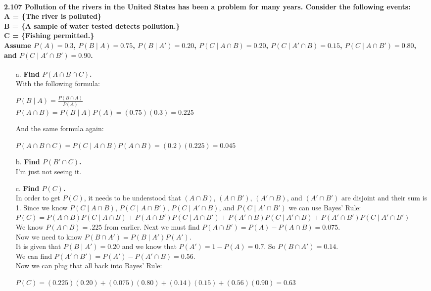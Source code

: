 \documentclass{article}
\begin{document}
\paragraph{2.107 Pollution of the rivers in the United States has been a problem for many 
years. Consider the following events:\\
A = \{The river is polluted\}\\
B = \{A sample of water tested detects pollution.\}\\
C = \{Fishing permitted.\}\\
Assume $P(A) = 0.3$, $P(B \mid A) = 0.75$, $P(B \mid A') = 0.20$, $P(C \mid A \cap B) = 0.20$,
$P(C \mid A' \cap B) = 0.15$, $P(C \mid A \cap B') = 0.80$, and $P(C \mid A' \cap B') = 0.90$.}
\begin{enumerate}
\item[a.] \textbf{Find $P(A \cap B \cap C)$.}\\
With the following formula:
\begin{center}
$P(B \mid A) = \frac{P(B \cap A)}{P(A)}$\\
$P(A \cap B) = P(B \mid A)P(A) = (0.75)(0.3) = 0.225$ 
\end{center}
And the same formula again:
\begin{center}
$\boxed{P(A \cap B \cap C) = P(C \mid A \cap B)P(A \cap B) = (0.2)(0.225) = 0.045}$
\end{center}
\item[b.] \textbf{Find $P(B' \cap C)$.}\\
I'm just not seeing it.
\item[c.] \textbf{Find $P(C)$.}\\
In order to get $P(C)$, it needs to be understood that $(A \cap B)$, $(A \cap B')$, $(A' \cap B)$,
and $(A' \cap B')$ are disjoint and their sum is 1. Since we know $P(C \mid A \cap B)$, 
$P(C \mid A \cap B')$, $P(C \mid A' \cap B)$, and $P(C \mid A' \cap B')$ we can use Bayes'
Rule:\\
$P(C) = P(A \cap B)P(C \mid A \cap B) + P(A \cap B')P(C \mid A \cap B') +
P(A' \cap B)P(C \mid A' \cap B) + P(A' \cap B')P(C \mid A' \cap B')$\\
We know $P(A \cap B) = .225$ from earlier. Next we must find $P(A \cap B') = 
P(A) - P(A \cap B) = 0.075$.\\
Now we need to know $P(B \cap A') = P(B \mid A')P(A')$.\\
It is given that $P(B \mid A') = 0.20$ and we know that $P(A') = 1-P(A) = 0.7$. So 
$P(B \cap A') = 0.14$.\\ We can find $P(A' \cap B') = P(A')-P(A' \cap B) = 0.56$.\\
Now we can plug that all back into Bayes' Rule:
\begin{center}
$\boxed{P(C) = (0.225)(0.20)+(0.075)(0.80)+(0.14)(0.15)+(0.56)(0.90) = 0.63}$
\end{center}
\end{enumerate}
\end{document}
